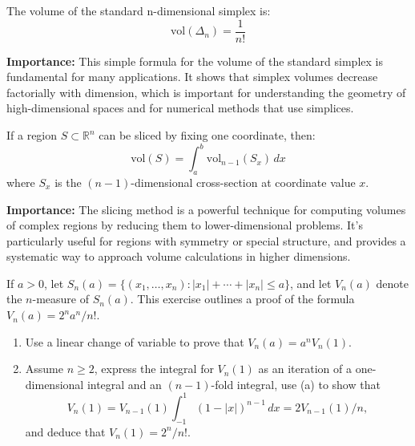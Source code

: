 \begin{theorem}
The volume of the standard n-dimensional simplex is:
\[\text{vol}(\Delta_n) = \frac{1}{n!}\]
\end{theorem}

\noindent\textbf{Importance:} This simple formula for the volume of the standard simplex is fundamental for many applications. It shows that simplex volumes decrease factorially with dimension, which is important for understanding the geometry of high-dimensional spaces and for numerical methods that use simplices.



\begin{theorem}
If a region $S \subset \mathbb{R}^n$ can be sliced by fixing one coordinate, then:
\[\text{vol}(S) = \int_a^b \text{vol}_{n-1}(S_x) \, dx\]
where $S_x$ is the $(n-1)$-dimensional cross-section at coordinate value $x$.
\end{theorem}

\noindent\textbf{Importance:} The slicing method is a powerful technique for computing volumes of complex regions by reducing them to lower-dimensional problems. It's particularly useful for regions with symmetry or special structure, and provides a systematic way to approach volume calculations in higher dimensions.





\begin{problembox}
\begin{problemstatement}
If \( a > 0 \), let \( S_n(a) = \{(x_1, \ldots, x_n): |x_1| + \cdots + |x_n| \leq a\} \), and let \( V_n(a) \) denote the \( n \)-measure of \( S_n(a) \). This exercise outlines a proof of the formula \( V_n(a) = 2^n a^n / n! \).
\begin{enumerate}[label=(\alph*)]
\item Use a linear change of variable to prove that \( V_n(a) = a^n V_n(1) \).
\item Assume \( n \geq 2 \), express the integral for \( V_n(1) \) as an iteration of a one-dimensional integral and an \( (n - 1) \)-fold integral, use (a) to show that
\[
V_n(1) = V_{n-1}(1) \int_{-1}^1 (1 - |x|)^{n-1} \, dx = 2V_{n-1}(1)/n,
\]
and deduce that \( V_n(1) = 2^n / n! \).
\end{enumerate}
\end{problemstatement}
\end{problembox}


